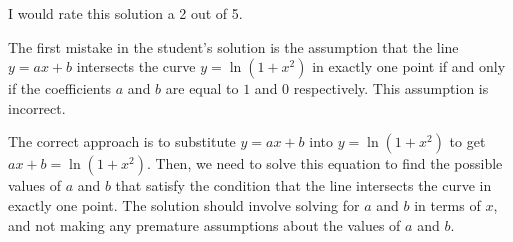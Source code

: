 I would rate this solution a 2 out of 5.

The first mistake in the student's solution is the assumption that the line $y = ax + b$ intersects the curve $y = \ln(1+x^2)$ in exactly one point if and only if the coefficients $a$ and $b$ are equal to $1$ and $0$ respectively. This assumption is incorrect.

The correct approach is to substitute $y = ax + b$ into $y = \ln(1+x^2)$ to get $ax + b = \ln(1+x^2)$. Then, we need to solve this equation to find the possible values of $a$ and $b$ that satisfy the condition that the line intersects the curve in exactly one point. The solution should involve solving for $a$ and $b$ in terms of $x$, and not making any premature assumptions about the values of $a$ and $b$.
